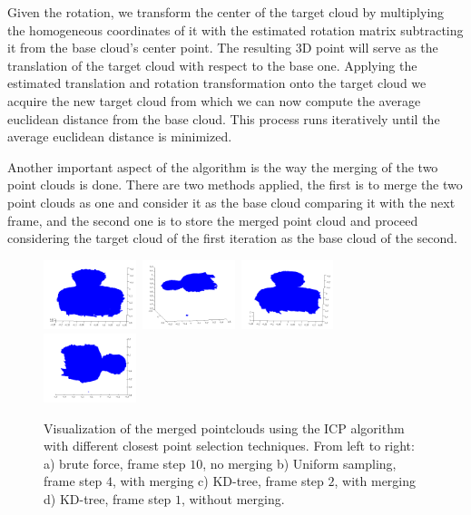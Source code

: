 Given the rotation, we transform the center of the target cloud by multiplying the homogeneous coordinates of it with the estimated rotation matrix subtracting it from the base cloud's center point. The resulting 3D point will serve as the translation of the target cloud with respect to the base one. Applying the estimated translation and rotation transformation onto the target cloud we acquire the new target cloud from which we can now compute the average euclidean distance from the base cloud. This process runs iteratively until the average euclidean distance is minimized.

Another important aspect of the algorithm is the way the merging of the two point clouds is done. There are two methods applied, the first is to merge the two point clouds as one and consider it as the base cloud comparing it with the next frame, and the second one is to store the merged point cloud and proceed considering the target cloud of the first iteration as the base cloud of the second.

\begin{figure}[bt!]
  \centering
    \includegraphics[width=0.24\textwidth]{figures/unBf10.png}\	
    \includegraphics[width=0.24\textwidth]{figures/meUs4.png}\	
    \includegraphics[width=0.24\textwidth]{figures/meKd2.png}\	
    \includegraphics[width=0.24\textwidth]{figures/unKd1.png}
    \caption{Visualization of the merged pointclouds using the ICP algorithm with different closest point selection techniques. From left to right: a) brute force, frame step $10$, no merging b) Uniform sampling, frame step $4$, with merging c) KD-tree, frame step $2$, with merging d) KD-tree, frame step $1$, without merging. }
    \label{fig:mergedICP}
\end{figure}

